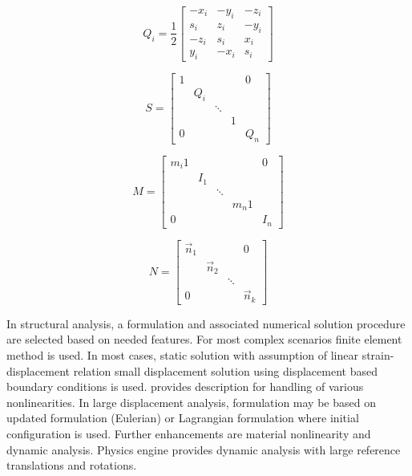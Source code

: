 \begin{equation} \label{eq:matrixQi}
Q_i = \frac{1}{2} \left[ \begin{array}{ccc}
-x_i & -y_i & -z_i \\
s_i & z_i & -y_i \\
-z_i & s_i & x_i \\
y_i & -x_i & s_i
\end{array} \right]
\end{equation}

\begin{equation} \label{eq:matrixS}
S =  \left[ \begin{array}{ccccc}
1 &  &  & & 0 \\
 & Q_i  \\
 & & \ddots  \\
 & & & 1 \\
0 & & & & Q_n 
\end{array} \right]
\end{equation}

\begin{equation} \label{eq:matrixM}
M =  \left[ \begin{array}{ccccc}
m_i 1 &  &  & & 0 \\
 & I_1  \\
 & & \ddots  \\
 & & & m_n 1 \\
0 & & & & I_n 
\end{array} \right]
\end{equation}

\begin{equation} \label{eq:matrixN}
N =  \left[ \begin{array}{cccc}
\vec{n}_1 &  & & 0 \\
 & \vec{n}_2  \\
 & & \ddots  \\
0  & & & \vec{n}_k 
\end{array} \right]
\end{equation}


In structural analysis, a formulation and associated numerical solution procedure are selected 
based on needed features.
For most complex scenarios finite element method is used.
In most cases, static solution with assumption of linear strain-displacement relation small 
displacement solution using displacement based boundary conditions is used.
\citet{bathe-1975} provides description for handling of various nonlinearities.
In large displacement analysis, formulation may be based on updated formulation (Eulerian) or
Lagrangian formulation where initial configuration is used.
Further enhancements are material nonlinearity and dynamic analysis.
Physics engine provides dynamic analysis with large reference translations and rotations.


